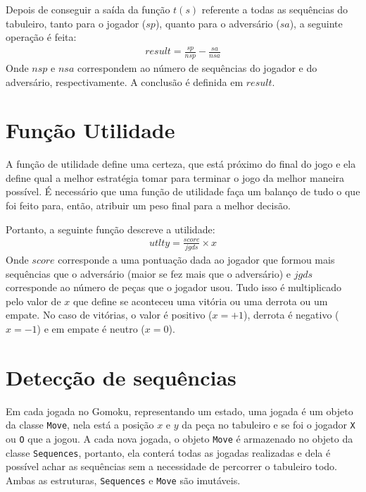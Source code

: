 \documentclass{article}
\begin{document}
        Depois de conseguir a saída da função $t(s)$ referente a todas as
        sequências do tabuleiro, tanto para o jogador ($sp$), quanto para o
        adversário ($sa$), a seguinte operação é feita:
        \begin{gather*}
            result = \frac{sp}{nsp} - \frac{sa}{nsa}
        \end{gather*}
        Onde $nsp$ e $nsa$ correspondem ao número de sequências do jogador e do
        adversário, respectivamente. A conclusão é definida em $result$.
        
    \section*{Função Utilidade}
        A função de utilidade define uma certeza, que está próximo do final do
        jogo e ela define qual a melhor estratégia tomar para terminar o jogo
        da melhor maneira possível. É necessário que uma função de utilidade
        faça um balanço de tudo o que foi feito para, então, atribuir um peso
        final para a melhor decisão.
        
        Portanto, a seguinte função descreve a utilidade:
        \begin{gather*}
            utlty = \frac{score}{jgds} \times x 
        \end{gather*}
        Onde $score$ corresponde a uma pontuação dada ao jogador que formou
        mais sequências que o adversário (maior se fez mais que o adversário) e
        $jgds$ corresponde ao número de peças que o jogador usou. Tudo isso é
        multiplicado pelo valor de $x$ que define se aconteceu uma vitória ou
        uma derrota ou um empate. No caso de vitórias, o valor é positivo ($x =
        +1$), derrota é negativo ($x = -1$) e em empate é neutro ($x = 0$).
        
    \section*{Detecção de sequências}
        Em cada jogada no Gomoku, representando um estado, uma jogada é um
        objeto da classe \texttt{Move}, nela está a posição $x$ e $y$ da peça
        no tabuleiro e se foi o jogador \texttt{X} ou \texttt{O} que a jogou. A
        cada nova jogada, o objeto \texttt{Move} é armazenado no objeto da
        classe \texttt{Sequences}, portanto, ela conterá todas as jogadas
        realizadas e dela é possível achar as sequências sem a necessidade de
        percorrer o tabuleiro todo. Ambas as estruturas, \texttt{Sequences} e
        \texttt{Move} são imutáveis.
        
\end{document}

